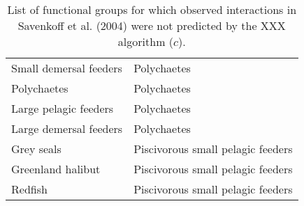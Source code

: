 \documentclass[letterpaper]{article}
\begin{document}
\begin{table}[h!]
\begin{tabular}{|l|l|}
    Small demersal feeders & Polychaetes    \\
    Polychaetes            & Polychaetes    \\
    Large pelagic feeders  & Polychaetes    \\
    Large demersal feeders & Polychaetes    \\
    Grey seals             & Piscivorous small pelagic feeders  \\
    Greenland halibut      & Piscivorous small pelagic feeders  \\
    Redfish                & Piscivorous small pelagic feeders  \\
    \hline
  \end{tabular}
  \caption{List of functional groups for which observed interactions in Savenkoff et al. (2004) were not predicted by the XXX algorithm ($c$).}
\end{table}
\end{document}
